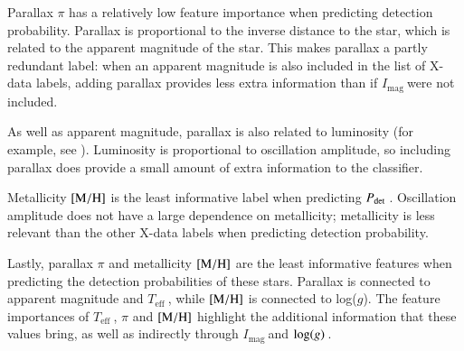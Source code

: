 \documentclass[a4paper,fleqn,usenatbib,useAMS]{mnras}
\newcommand{\teff}{\ensuremath{T_{\textrm{eff}}\:}}
\newcommand{\pdet}{\ensuremath{P_{\rm det}\:}}
\newcommand{\imag}{\ensuremath{I_{\textrm{mag}}\:}}
\newcommand{\logg}{\ensuremath{{\rm log}(g)\:}}
\begin{document}
Parallax $\pi$ has a relatively low feature importance when predicting detection probability. Parallax is proportional to the inverse distance to the star, which is related to the apparent magnitude of the star. This makes parallax a partly redundant label: when an apparent magnitude is also included in the list of X-data labels, adding parallax provides less extra information than if \imag were not included.

As well as apparent magnitude, parallax is also related to luminosity (for example, see \citet{torres_accurate_2010}). Luminosity is proportional to oscillation amplitude, so including parallax does provide a small amount of extra information to the classifier.

Metallicity $\rm [M/H]$ is the least informative label when predicting \pdet. Oscillation amplitude does not have a large dependence on metallicity; metallicity is less relevant than the other X-data labels when predicting detection probability.


Lastly, parallax $\pi$ and metallicity $\rm [M/H]$ are the least informative features when predicting the detection probabilities of these stars. Parallax is connected to apparent magnitude and \teff, while $\rm [M/H]$ is connected to log($g$). The feature importances of \teff, $\pi$ and $\rm [M/H]$ highlight the additional information that these values bring, as well as indirectly through \imag and \logg.




 

\end{document}
